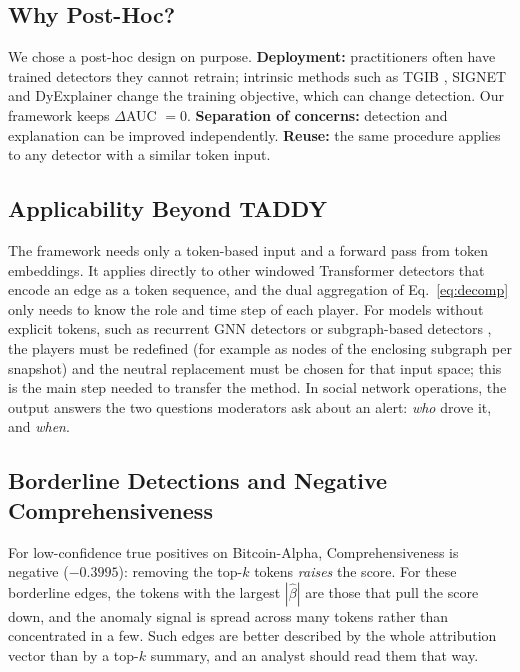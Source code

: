 \documentclass[conference]{IEEEtran}
\begin{document}
\subsection{Why Post-Hoc?}
\label{subsec:posthoc}
We chose a post-hoc design on purpose. \textbf{Deployment:} practitioners often
have trained detectors they cannot retrain; intrinsic methods such as TGIB
\cite{seo2024tgib}, SIGNET \cite{liu2023signet} and DyExplainer
\cite{wang2023dyexplainer} change the training objective, which can change
detection. Our framework keeps $\Delta$AUC $=0$. \textbf{Separation of
concerns:} detection and explanation can be improved independently.
\textbf{Reuse:} the same procedure applies to any detector with a similar
token input.

\subsection{Applicability Beyond TADDY}
The framework needs only a token-based input and a forward pass from token
embeddings. It applies directly to other windowed Transformer detectors that
encode an edge as a token sequence, and the dual aggregation of
Eq.~\eqref{eq:decomp} only needs to know the role and time step of each player.
For models without explicit tokens, such as recurrent GNN detectors
\cite{zheng2019addgraph} or subgraph-based detectors \cite{cai2021strgnn}, the
players must be redefined (for example as nodes of the enclosing subgraph per
snapshot) and the neutral replacement must be chosen for that input space; this
is the main step needed to transfer the method. In social network operations,
the output answers the two questions moderators ask about an alert: \emph{who}
drove it, and \emph{when}.

\subsection{Borderline Detections and Negative Comprehensiveness}
\label{subsec:borderline}
For low-confidence true positives on Bitcoin-Alpha, Comprehensiveness is
negative ($-0.3995$): removing the top-$k$ tokens \emph{raises} the score. For
these borderline edges, the tokens with the largest $|\hat\beta|$ are those
that pull the score down, and the anomaly signal is spread across many tokens
rather than concentrated in a few. Such edges are better described by the whole
attribution vector than by a top-$k$ summary, and an analyst should read them
that way.

\end{document}
